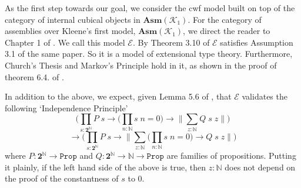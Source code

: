 \documentclass[12pt]{report}
\theoremstyle{definition}
\begin{document}
As the first step towards our goal, we consider the cwf model built on top of the category of internal cubical objects in $\mathbf{Asm}(\mathcal{K}_1)$. 
For the category of assemblies over Kleene's first model, $\mathbf{Asm}(\mathcal{K}_1)$, we direct the reader to Chapter 1 of \cite{vanOosten:2008:RVI:1816956}. 
We call this model $\mathcal{E}$. 
By Theorem 3.10 of \cite{1905.03014} $\mathcal{E}$ satisfies Assumption 3.1 of the same paper. 
So it is a model of extensional type theory. 
Furthermore, Church's Thesis and Markov's Principle hold in it, as shown in the proof of theorem 6.4.  of \cite{1905.03014}. 

In addition to the above, we expect, given Lemma 5.6 of \cite{rathjen2018lifschitz}, that $\mathcal{E}$ validates the following `Independence Principle'
$$\bigg( \prod_{s : \mathbf{2}^\mathbb{N}} P\; s \rightarrow \Big(\prod_{n : \mathbb{N}}s\; n = 0 \Big) \rightarrow \Big\lVert \sum_{z : \mathbb{N}} Q\; s\; z\Big\rVert \bigg)$$
$$\rightarrow \bigg( \prod_{s : \mathbf{2}^\mathbb{N}} P\; s \rightarrow  \Big\lVert \sum_{z:\mathbb{N}} \Big(\prod_{n : \mathbb{N}}s\; n = 0 \Big) \rightarrow Q \; s\;z\Big\rVert \bigg)$$
where $P: \mathbf{2}^\mathbb{N} \rightarrow \mathtt{Prop}$ and $Q : \mathbf{2}^\mathbb{N} \rightarrow \mathbb{N}\rightarrow \mathtt{Prop} $ are families of propositions. 
Putting it plainly, if the left hand side of the above is true, then $z : \mathbb{N}$ does not depend on the proof of the constantness of $s$ to $0$.
\end{document}
